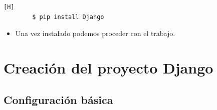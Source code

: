 \documentclass{article}
\begin{document}
        \begin{lstlisting}[language=bash,caption={Instalación del paquete DJango}][H]
        $ pip install Django
        \end{lstlisting}

        \begin{itemize}	
            \item Una vez instalado podemos proceder con el trabajo.
	\end{itemize}

    \section{Creación del proyecto Django}
        \subsection{Configuración básica}
\end{document}

